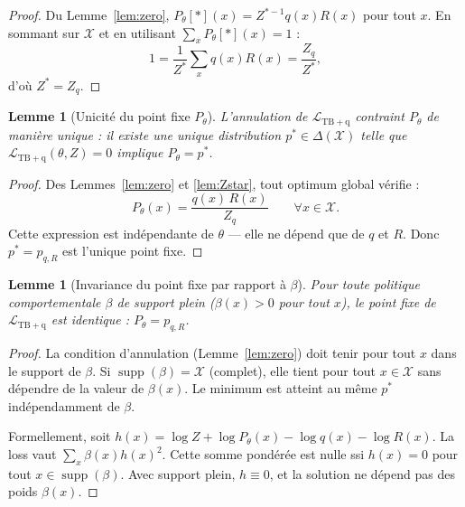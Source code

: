 \documentclass[11pt,a4paper]{article}
\theoremstyle{plain}
\newtheorem{lemma}[theorem]{Lemme}
\theoremstyle{definition}
\theoremstyle{remark}
\newcommand{\calX}{\mathcal{X}}
\newcommand{\calL}{\mathcal{L}}
\newcommand{\logZ}{\log Z}
\newcommand{\pth}{P_\theta}
\newcommand{\supp}{\operatorname{supp}}
\begin{document}
\begin{proof}
Du Lemme~\ref{lem:zero}, $\pth[*](x) = Z^{*-1} q(x) R(x)$ pour tout $x$.
En sommant sur $\calX$ et en utilisant $\sum_x \pth[*](x) = 1$ :
\begin{equation}
  1 = \frac{1}{Z^*} \sum_{x} q(x) R(x) = \frac{Z_q}{Z^*},
\end{equation}
d'où $Z^* = Z_q$.
\end{proof}

\begin{lemma}[Unicité du point fixe $\pth$]
\label{lem:unique}
L'annulation de $\calL_{\mathrm{TB+q}}$ contraint $\pth$ de manière unique :
il existe une unique distribution $p^* \in \Delta(\calX)$ telle que
$\calL_{\mathrm{TB+q}}(\theta, Z) = 0$ implique $\pth = p^*$.
\end{lemma}

\begin{proof}
Des Lemmes~\ref{lem:zero} et \ref{lem:Zstar}, tout optimum global vérifie :
\begin{equation}
  \pth(x) = \frac{q(x)\,R(x)}{Z_q} \qquad \forall x \in \calX.
\end{equation}
Cette expression est indépendante de $\theta$ — elle ne dépend que de $q$ et $R$.
Donc $p^* = p_{q,R}$ est l'unique point fixe.
\end{proof}

\begin{lemma}[Invariance du point fixe par rapport à $\beta$]
\label{lem:beta}
Pour toute politique comportementale $\beta$ de support plein ($\beta(x) > 0$
pour tout $x$), le point fixe de $\calL_{\mathrm{TB+q}}$ est identique :
$\pth = p_{q,R}$.
\end{lemma}

\begin{proof}
La condition d'annulation (Lemme~\ref{lem:zero}) doit tenir pour tout $x$
dans le support de $\beta$. Si $\supp(\beta) = \calX$ (complet), elle tient
pour tout $x \in \calX$ sans dépendre de la valeur de $\beta(x)$.
Le minimum est atteint au même $p^*$ indépendamment de $\beta$.

Formellement, soit $h(x) = \logZ + \log\pth(x) - \log q(x) - \log R(x)$.
La loss vaut $\sum_x \beta(x) h(x)^2$.
Cette somme pondérée est nulle ssi $h(x) = 0$ pour tout $x \in \supp(\beta)$.
Avec support plein, $h \equiv 0$, et la solution ne dépend pas des poids $\beta(x)$.
\end{proof}
\end{document}
